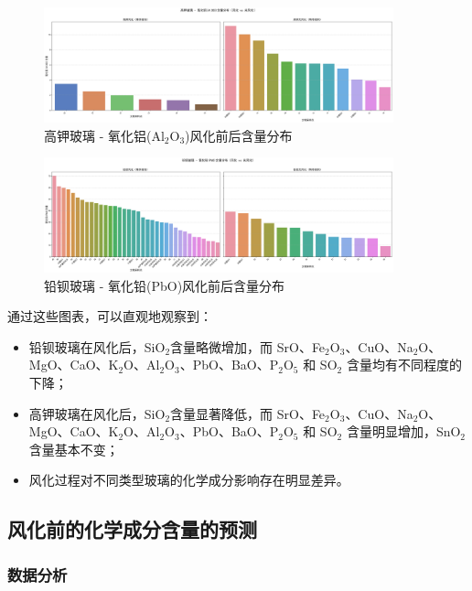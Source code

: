 \documentclass[withoutpreface,bwprint]{cumcmthesis}
\begin{document}
\begin{figure}[H]
\centering
\includegraphics[width=0.9\textwidth]{figures/1.2/高钾玻璃 - 氧化铝(Al2O3)含量分布（风化 vs 未风化）.png}
\caption{高钾玻璃 - 氧化铝(Al$_2$O$_3$)风化前后含量分布}
\label{fig:高钾玻璃 - 氧化铝(Al$_2$O$_3$)风化前后含量分布}
\end{figure}

\begin{figure}[H]
\centering
\includegraphics[width=0.9\textwidth]{figures/1.2/铅钡玻璃 - 氧化铅(PbO)含量分布（风化 vs 未风化）.png}
\caption{铅钡玻璃 - 氧化铅(PbO)风化前后含量分布}
\label{fig:铅钡玻璃 - 氧化铅(PbO)风化前后含量分布}
\end{figure}

通过这些图表，可以直观地观察到：

\begin{itemize}
    \item 铅钡玻璃在风化后，SiO$_2$含量略微增加，而 SrO、Fe$_2$O$_3$、CuO、Na$_2$O、MgO、CaO、K$_2$O、Al$_2$O$_3$、PbO、BaO、P$_2$O$_5$ 和 SO$_2$ 含量均有不同程度的下降；
    \item 高钾玻璃在风化后，SiO$_2$含量显著降低，而 SrO、Fe$_2$O$_3$、CuO、Na$_2$O、MgO、CaO、K$_2$O、Al$_2$O$_3$、PbO、BaO、P$_2$O$_5$ 和 SO$_2$ 含量明显增加，SnO$_2$含量基本不变；
    \item 风化过程对不同类型玻璃的化学成分影响存在明显差异。
\end{itemize}

\subsection{风化前的化学成分含量的预测}

\subsubsection{数据分析}
\end{document}
